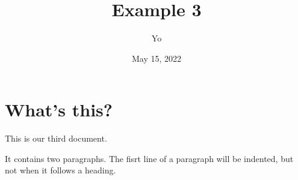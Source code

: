\documentclass[a4paper, 11pt]{article}
\begin{document}
	\title{Example 3}
	\author{Yo}
	\date{May 15, 2022}
	\maketitle
	\section{What's this?}
	This 		is	 our third document.
	
	It contains two paragraphs. The fisrt line of a paragraph will be indented, but not when it follows a heading.
\end{document}
